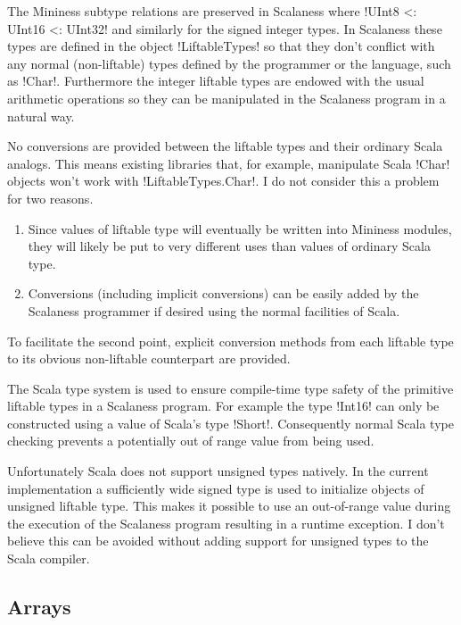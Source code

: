 The Mininess subtype relations are preserved in Scalaness where !UInt8 <: UInt16 <: UInt32! and
similarly for the signed integer types. In Scalaness these types are defined in the object
!LiftableTypes! so that they don't conflict with any normal (non-liftable) types defined by the
programmer or the language, such as !Char!. Furthermore the integer liftable types are endowed
with the usual arithmetic operations so they can be manipulated in the Scalaness program in a
natural way.

No conversions are provided between the liftable types and their ordinary Scala analogs. This
means existing libraries that, for example, manipulate Scala !Char! objects won't work with
!LiftableTypes.Char!. I do not consider this a problem for two reasons.
\begin{enumerate}
\item Since values of liftable type will eventually be written into Mininess modules, they will
  likely be put to very different uses than values of ordinary Scala type.
\item Conversions (including implicit conversions) can be easily added by the Scalaness
  programmer if desired using the normal facilities of Scala.
\end{enumerate}

To facilitate the second point, explicit conversion methods from each liftable type to its
obvious non-liftable counterpart are provided.


The Scala type system is used to ensure compile-time type safety of the primitive liftable types
in a Scalaness program. For example the type !Int16! can only be constructed using a value of
Scala's type !Short!. Consequently normal Scala type checking prevents a potentially out of
range value from being used.

Unfortunately Scala does not support unsigned types natively. In the current implementation a
sufficiently wide signed type is used to initialize objects of unsigned liftable type. This
makes it possible to use an out-of-range value during the execution of the Scalaness program
resulting in a runtime exception. I don't believe this can be avoided without adding support for
unsigned types to the Scala compiler.

\subsection{Arrays}
\label{section-arrays-design}

